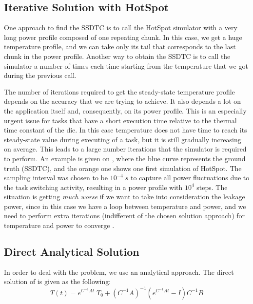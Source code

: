 \subsection{Iterative Solution with HotSpot}
One approach to find the SSDTC is to call the HotSpot simulator with a very long power profile composed of one repeating chunk. In this case, we get a huge temperature profile, and we can take only its tail that corresponds to the last chunk in the power profile. Another way to obtain the SSDTC is to call the simulator a number of times each time starting from the temperature that we got during the previous call.


The number of iterations required to get the steady-state temperature profile depends on the accuracy that we are trying to achieve. It also depends a lot on the application itself and, consequently, on its power profile. This is an especially urgent issue for tasks that have a short execution time relative to the thermal time constant of the die. In this case temperature does not have time to reach its steady-state value during executing of a task, but it is still gradually increasing on average. This leads to a large number iterations that the simulator is required to perform. An example is given on , where the blue curve represents the ground truth (SSDTC), and the orange one shows one first simulation of HotSpot. The sampling interval was chosen to be $10^{-4} \; s$ to capture all power fluctuations due to the task switching activity, resulting in a power profile with $10^4$ steps. The situation is getting \emph{much worse} if we want to take into consideration the leakage power, since in this case we have a loop between temperature and power, and we need to perform extra iterations (indifferent of the chosen solution approach) for temperature and power to converge \cite{liu2007}.

\subsection{Direct Analytical Solution}
In order to deal with the problem, we use an analytical approach. The direct solution of  is given as the following:
\begin{equation} \label{eq:solution}
  T(t) = e^{C^{-1}A t} \; T_0 + (C^{-1} A)^{-1}(e^{C^{-1}A t} - I)C^{-1} B
\end{equation}

